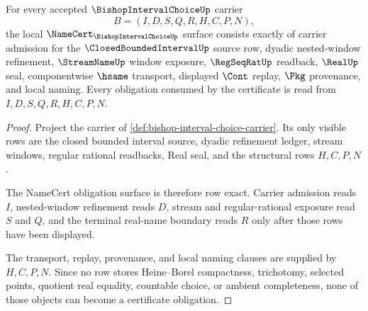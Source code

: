 \begin{theorem}
\label{thm:bishop-interval-choice-namecert-obligations}
For every accepted $\BishopIntervalChoiceUp$ carrier
$$
B=(I,D,S,Q,R,H,C,P,N),
$$
the local $\NameCert_{\BishopIntervalChoiceUp}$ surface consists exactly of carrier admission for the $\ClosedBoundedIntervalUp$ source row, dyadic nested-window refinement, $\StreamNameUp$ window exposure, $\RegSeqRatUp$ readback, $\RealUp$ seal, componentwise $\hsame$ transport, displayed $\Cont$ replay, $\Pkg$ provenance, and local naming. Every obligation consumed by the certificate is read from $I,D,S,Q,R,H,C,P,N$.
\end{theorem}
\begin{proof}
Project the carrier of \autoref{def:bishop-interval-choice-carrier}. Its only visible rows are the closed bounded interval source, dyadic refinement ledger, stream windows, regular rational readbacks, Real seal, and the structural rows $H,C,P,N$.

The NameCert obligation surface is therefore row exact. Carrier admission reads $I$, nested-window refinement reads $D$, stream and regular-rational exposure read $S$ and $Q$, and the terminal real-name boundary reads $R$ only after those rows have been displayed.

The transport, replay, provenance, and local naming clauses are supplied by $H,C,P,N$. Since no row stores Heine--Borel compactness, trichotomy, selected points, quotient real equality, countable choice, or ambient completeness, none of those objects can become a certificate obligation.
\end{proof}

